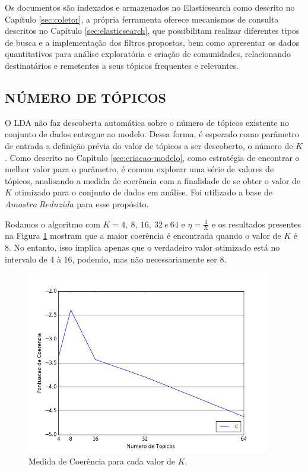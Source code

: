 \documentclass[12pt,a4paper]{article}
\begin{document}
Os documentos são indexados e armazenados no Elasticsearch como descrito no Capítulo \ref{sec:coletor}, a própria ferramenta oferece mecanismos de consulta descritos no Capítulo \ref{sec:elasticsearch}, que possibilitam realizar diferentes tipos de busca e a implementação dos filtros propostos, bem como apresentar os dados quantitativos para análise exploratória e criação de comunidades, relacionando destinatários e remetentes a seus tópicos frequentes e relevantes.

\subsection{NÚMERO DE TÓPICOS} \label{sec:n-topicos}

O LDA não faz descoberta automática  sobre o número de tópicos existente no conjunto de dados entregue ao modelo. Dessa forma,
 é esperado como parâmetro de entrada a definição prévia do valor de tópicos a ser descoberto, o número de $K$. Como descrito no Capítulo \ref{sec:criacao-modelo}, como estratégia de encontrar o melhor valor para o parâmetro, é comum explorar uma série de valores de tópicos, analisando  a medida de coerência com a finalidade de se obter o valor de $K$ otimizado para o conjunto de dados em análise. Foi utilizado a 
 base de $Amostra\ Reduzida$ para esse propósito.

Rodamos o algoritmo com $K=4,\ 8,\ 16,\ 32\ e\ 64$ e $\eta=\frac{1}{K}$ e os resultados presentes na Figura \ref{fig-cm-4-to-64}
 mostram que a maior coerência é encontrada quando o valor de $K$ é 8. No entanto, isso implica apenas que o verdadeiro 
 valor otimizado está no intervalo de 4 à 16, podendo, mas não necessariamente ser 8.

\begin{figure}[H]
	\centering
    \includegraphics[height=8cm]{images/figure_5.png}
    \caption{Medida de Coerência para cada valor de $K$.}
    \label{fig-cm-4-to-64}
\end{figure}
\end{document}
